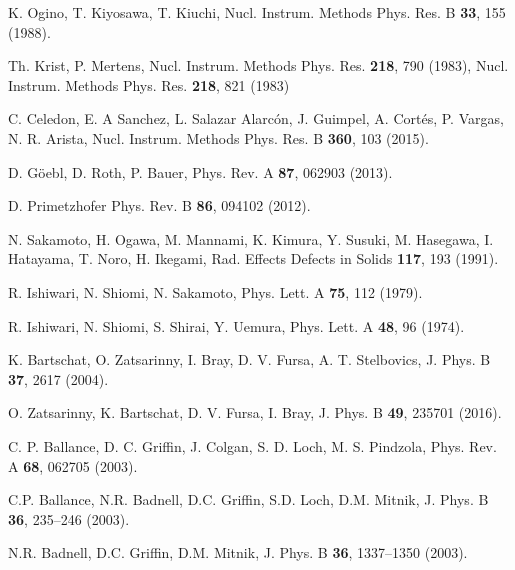 \begin{thebibliography}{9}
K. Ogino, T. Kiyosawa, T. Kiuchi, 
Nucl. Instrum. Methods Phys. Res. B \textbf{33}, 155 (1988).

Th. Krist, P. Mertens,
Nucl. Instrum. Methods Phys. Res. \textbf{218}, 790 (1983),
Nucl. Instrum. Methods Phys. Res. \textbf{218}, 821 (1983)

C. Celedon, E. A Sanchez, L. Salazar Alarcón, J. Guimpel, A. Cortés,
P. Vargas, N. R. Arista,
Nucl. Instrum. Methods Phys. Res. B \textbf{360}, 103 (2015).

D. G\"oebl, D. Roth, P. Bauer, 
Phys. Rev. A \textbf{87}, 062903 (2013).

D. Primetzhofer
Phys. Rev. B \textbf{86}, 094102 (2012).

N. Sakamoto, H. Ogawa, M. Mannami, K. Kimura, Y. Susuki, M. Hasegawa,
I. Hatayama, T. Noro, H. Ikegami, 
Rad. Effects Defects in Solids \textbf{117}, 193 (1991).

R. Ishiwari, N. Shiomi, N. Sakamoto, 
Phys. Lett. A \textbf{75}, 112 (1979).

R. Ishiwari, N. Shiomi, S. Shirai, Y. Uemura, 
Phys. Lett. A \textbf{48}, 96 (1974).


K. Bartschat, O. Zatsarinny, I. Bray, D. V. Fursa, A. T. Stelbovics,
J. Phys. B \textbf{37}, 2617 (2004).

O. Zatsarinny, K. Bartschat, D. V. Fursa, I. Bray,
J. Phys. B \textbf{49}, 235701 (2016).

C. P. Ballance, D. C. Griffin, J. Colgan, S. D. Loch, M. S. Pindzola,
Phys. Rev. A \textbf{68}, 062705 (2003).

C.P. Ballance, N.R. Badnell, D.C. Griffin, S.D. Loch, D.M. Mitnik, 
J. Phys. B \textbf{36}, 235--246 (2003).

N.R. Badnell, D.C. Griffin, D.M. Mitnik, 
J. Phys. B \textbf{36}, 1337--1350 (2003).


\end{thebibliography}
